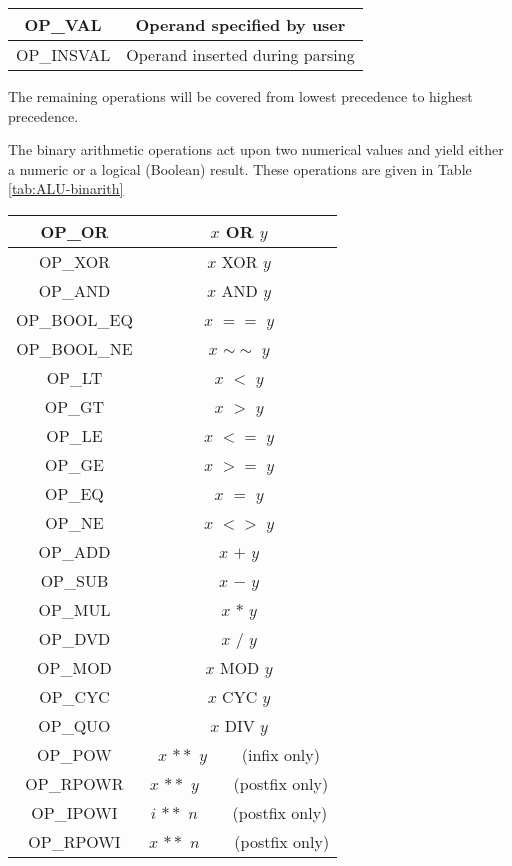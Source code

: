 \starttab
\begin{tabular}{|c|c|}
\hline OP\_VAL    & Operand specified by user \\
\hline OP\_INSVAL & Operand inserted during parsing \\
\hline
\end{tabular}

The remaining operations will be covered from lowest precedence to highest
precedence.

The binary arithmetic operations act upon two numerical values and yield
either a numeric or a logical (Boolean) result.   These operations are
given in Table \ref{tab:ALU-binarith}

\starttab
\begin{tabular}{|c|c|}
\hline OP\_OR            & $x$ OR $y$ \\
\hline OP\_XOR           & $x$ XOR $y$ \\
\hline OP\_AND           & $x$ AND $y$ \\
\hline OP\_BOOL\_EQ      & $x$ $==$ $y$ \\
\hline OP\_BOOL\_NE      & $x$ $\sim\sim$ $y$ \\
\hline OP\_LT            & $x$ $<$ $y$ \\
\hline OP\_GT            & $x$ $>$ $y$ \\
\hline OP\_LE            & $x$ $<=$ $y$ \\
\hline OP\_GE            & $x$ $>=$ $y$ \\
\hline OP\_EQ            & $x$ $=$ $y$ \\
\hline OP\_NE            & $x$ $<>$ $y$ \\
\hline OP\_ADD           & $x$ $+$ $y$ \\
\hline OP\_SUB           & $x$ $-$ $y$ \\
\hline OP\_MUL           & $x$ $*$ $y$ \\
\hline OP\_DVD           & $x$ $/$ $y$ \\
\hline OP\_MOD           & $x$ MOD $y$ \\
\hline OP\_CYC           & $x$ CYC $y$ \\
\hline OP\_QUO           & $x$ DIV $y$ \\
\hline OP\_POW           & $x$ $**$ $y$ ~~~ (infix only) \\
\hline OP\_RPOWR         & $x$ $**$ $y$ ~~~ (postfix only) \\
\hline OP\_IPOWI         & $i$ $**$ $n$ ~~~ (postfix only) \\
\hline OP\_RPOWI         & $x$ $**$ $n$ ~~~ (postfix only) \\
\hline
\end{tabular}

